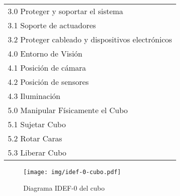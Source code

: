 \begin{table}[H]
\begin{tabular}{l}
3.0 \; Proteger y soportar el sistema \\
\hspace{0.5cm} 3.1 \; Soporte de actuadores \\
\hspace{0.5cm} 3.2 \; Proteger cableado y dispositivos electrónicos \\\hline
4.0 \; Entorno de Visión \\
\hspace{0.5cm} 4.1 \; Posición de cámara \\
\hspace{0.5cm} 4.2 \; Posición de sensores \\
\hspace{0.5cm} 4.3 \; Iluminación \\\hline
5.0 \; Manipular Físicamente el Cubo \\
\hspace{0.5cm} 5.1 \; Sujetar Cubo \\
\hspace{0.5cm} 5.2 \; Rotar Caras \\
\hspace{0.5cm} 5.3 \; Liberar Cubo \\\hline
\end{tabular}%
\end{table}
\renewcommand{\arraystretch}{1.0} %



\begin{figure}[H]
    \centering
    \texttt{[image: img/idef-0-cubo.pdf]} %
    \caption{Diagrama IDEF-0 del cubo}
    \label{fig:idef0cubo}
\end{figure}